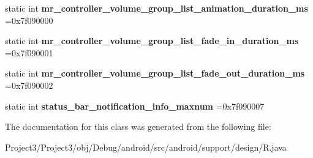\begin{DoxyCompactItemize}
\item 
\mbox{\label{classandroid_1_1support_1_1design_1_1R_1_1integer_ab3415ef1fa12ee18430c593c9498f1aa}} 
static int {\bfseries mr\+\_\+controller\+\_\+volume\+\_\+group\+\_\+list\+\_\+animation\+\_\+duration\+\_\+ms} =0x7f090000
\item 
\mbox{\label{classandroid_1_1support_1_1design_1_1R_1_1integer_a2ff921b79ef954845b505ff6fe8cee7f}} 
static int {\bfseries mr\+\_\+controller\+\_\+volume\+\_\+group\+\_\+list\+\_\+fade\+\_\+in\+\_\+duration\+\_\+ms} =0x7f090001
\item 
\mbox{\label{classandroid_1_1support_1_1design_1_1R_1_1integer_ad271a742c77f1cd9e85a8e64127a9a9b}} 
static int {\bfseries mr\+\_\+controller\+\_\+volume\+\_\+group\+\_\+list\+\_\+fade\+\_\+out\+\_\+duration\+\_\+ms} =0x7f090002
\item 
\mbox{\label{classandroid_1_1support_1_1design_1_1R_1_1integer_a029dc0f4fbf133a2f90f5fd348ee63cc}} 
static int {\bfseries status\+\_\+bar\+\_\+notification\+\_\+info\+\_\+maxnum} =0x7f090007
\end{DoxyCompactItemize}


The documentation for this class was generated from the following file\+:\begin{DoxyCompactItemize}
\item 
Project3/\+Project3/obj/\+Debug/android/src/android/support/design/R.\+java\end{DoxyCompactItemize}
